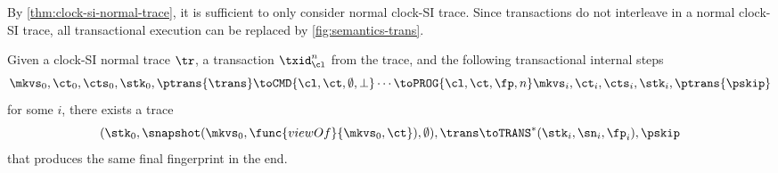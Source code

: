 By \cref{thm:clock-si-normal-trace}, it is sufficient to only consider normal clock-SI trace.
Since transactions do not interleave in a normal clock-SI trace,
all transactional execution can be replaced by \cref{fig:semantics-trans}.
\begin{theorem}[Simulation]
    \label{thm:clock-si-transaction-to-atomic}
    Given a clock-SI normal trace \( \tr \), a transaction \( \txid_\cl^n \) from the trace,
    and the following transactional internal steps
    \[
        \mkvs_0, \ct_0, \cts_0, \stk_0, \ptrans{\trans} \toCMD{\cl,\ct,\emptyset,\perp} \cdots  \toPROG{\cl,\ct,\fp,n} \mkvs_i, \ct_i, \cts_i, \stk_i, \ptrans{\pskip}
    \]
    for some \( i \), there exists a trace
    \[
        (\stk_0, \snapshot(\mkvs_0,\func{viewOf}{\mkvs_0,\ct}), \emptyset), \trans \toTRANS^*
        (\stk_i, \sn_i, \fp_i), \pskip
    \]
    that produces the same final fingerprint in the end.
\end{theorem}
